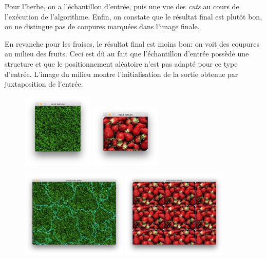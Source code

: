 \documentclass[a4paper, 12pt]{article}
\begin{document}
Pour l'herbe, on a l'échantillon d'entrée, puis une vue des \emph{cuts} au cours de l'exécution de l'algorithme.
Enfin, on constate que le résultat final est plutôt bon, on ne distingue pas de coupures marquées dans l'image finale.

En revanche pour les fraises, le résultat final est moins bon: on voit des coupures au milieu des fruits.
Ceci est dû au fait que l'échantillon d'entrée possède une structure et que le positionnement aléatoire n'est pas adapté pour ce type d'entrée.
L'image du milieu montre l'initialisation de la sortie obtenue par juxtaposition de l'entrée.

\begin{figure}
    \begin{center}
        \null\hfill
        \includegraphics[width=0.3\textwidth]{images/grass_input}
        \hfill\hfill
        \includegraphics[width=0.3\textwidth]{images/strawberries_input}
        \hfill\null

        \null\hfill
        \includegraphics[width=0.45\textwidth]{images/grass_graphcuts}
        \hfill\hfill
        \includegraphics[width=0.45\textwidth]{images/strawberries_initial}
        \hfill\null


\end{center}
\end{figure}
\end{document}
